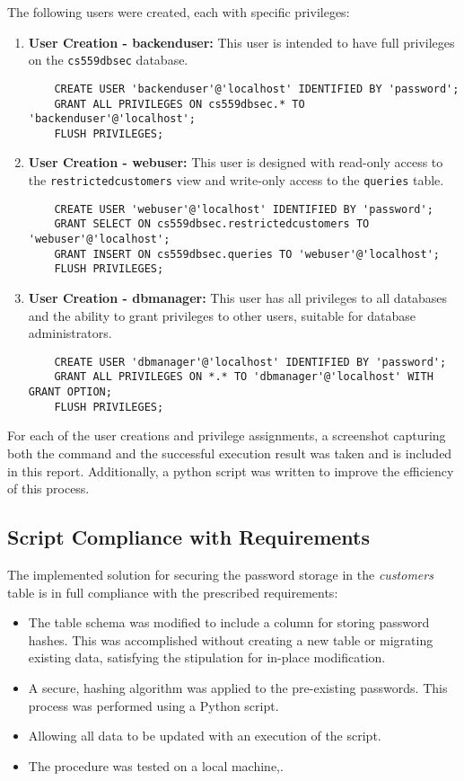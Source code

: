 \documentclass{article}
\begin{document}
The following users were created, each with specific privileges:

\begin{enumerate}
    \item \textbf{User Creation - backenduser:}
    This user is intended to have full privileges on the \texttt{cs559dbsec} database.
    \begin{verbatim}
    CREATE USER 'backenduser'@'localhost' IDENTIFIED BY 'password';
    GRANT ALL PRIVILEGES ON cs559dbsec.* TO 'backenduser'@'localhost';
    FLUSH PRIVILEGES;
    \end{verbatim}

    \item \textbf{User Creation - webuser:}
    This user is designed with read-only access to the \texttt{restrictedcustomers} view and write-only access to the \texttt{queries} table.
    \begin{verbatim}
    CREATE USER 'webuser'@'localhost' IDENTIFIED BY 'password';
    GRANT SELECT ON cs559dbsec.restrictedcustomers TO 'webuser'@'localhost';
    GRANT INSERT ON cs559dbsec.queries TO 'webuser'@'localhost';
    FLUSH PRIVILEGES;
    \end{verbatim}

    \item \textbf{User Creation - dbmanager:}
    This user has all privileges to all databases and the ability to grant privileges to other users, suitable for database administrators.
    \begin{verbatim}
    CREATE USER 'dbmanager'@'localhost' IDENTIFIED BY 'password';
    GRANT ALL PRIVILEGES ON *.* TO 'dbmanager'@'localhost' WITH GRANT OPTION;
    FLUSH PRIVILEGES;
    \end{verbatim}
\end{enumerate}

For each of the user creations and privilege assignments, a screenshot capturing both the command and the successful execution result was taken and is included in this report. Additionally, a python script was written to improve the efficiency of this process.

\subsection*{Script Compliance with Requirements}
The implemented solution for securing the password storage in the \textit{customers} table is in full compliance with the prescribed requirements:
\begin{itemize}
    \item The table schema was modified to include a column for storing password hashes. This was accomplished without creating a new table or migrating existing data, satisfying the stipulation for in-place modification.
    \item A secure, hashing algorithm was applied to the pre-existing passwords. This process was performed using a Python script.
    \item Allowing all data to be updated with an execution of the script.
    \item The procedure was tested on a local machine,.
\end{itemize}
\end{document}
